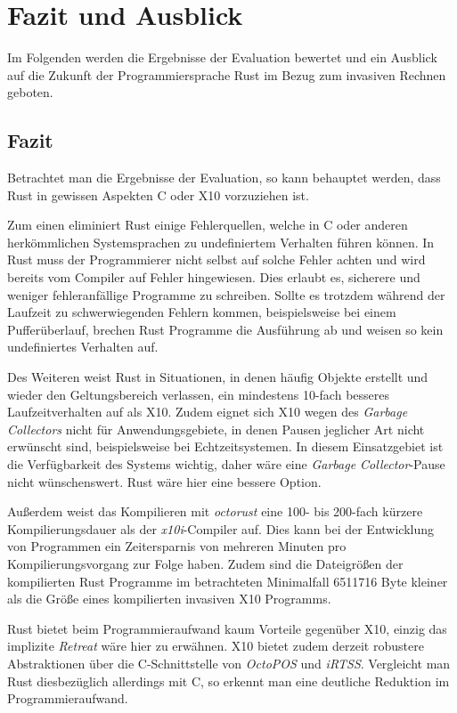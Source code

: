 \chapter{Fazit und Ausblick}\label{sec:conclusion}

Im Folgenden werden die Ergebnisse der Evaluation bewertet
und ein Ausblick auf die Zukunft der Programmiersprache Rust im Bezug zum invasiven Rechnen geboten.

\section{Fazit}

Betrachtet man die Ergebnisse der Evaluation, so kann behauptet werden,
dass Rust in gewissen Aspekten C oder X10 vorzuziehen ist.

Zum einen eliminiert Rust einige Fehlerquellen, welche in C oder anderen herkömmlichen
Systemsprachen zu undefiniertem Verhalten führen können.
In Rust muss der Programmierer nicht selbst auf solche Fehler achten und wird bereits vom Compiler auf Fehler
hingewiesen. Dies erlaubt es, sicherere und weniger fehleranfällige Programme zu schreiben.
Sollte es trotzdem während der Laufzeit zu schwerwiegenden Fehlern kommen, beispielsweise bei einem Pufferüberlauf,
brechen Rust Programme die Ausführung ab und weisen so kein undefiniertes Verhalten auf.

Des Weiteren weist Rust in Situationen, in denen häufig Objekte erstellt und wieder den Geltungsbereich verlassen,
ein mindestens 10-fach besseres Laufzeitverhalten auf als X10.
Zudem eignet sich X10 wegen des \textit{Garbage Collectors}
nicht für Anwendungsgebiete, in denen Pausen jeglicher Art nicht erwünscht sind,
beispielsweise bei Echtzeitsystemen.
In diesem Einsatzgebiet ist die Verfügbarkeit des Systems wichtig, daher wäre eine \textit{Garbage Collector}-Pause
nicht wünschenswert. Rust wäre hier eine bessere Option.

Außerdem weist das Kompilieren mit \textit{octorust} eine 100- bis 200-fach kürzere Kompilierungsdauer
als der \textit{x10i}-Compiler auf. Dies kann bei der Entwicklung von Programmen ein Zeitersparnis von
mehreren Minuten pro Kompilierungsvorgang zur Folge haben. 
Zudem sind die Dateigrößen der kompilierten Rust Programme im betrachteten Minimalfall 6511716 Byte kleiner
als die Größe eines kompilierten invasiven X10 Programms.

Rust bietet beim Programmieraufwand kaum Vorteile gegenüber X10, einzig das implizite \textit{Retreat} wäre hier zu 
erwähnen.
X10 bietet zudem derzeit robustere Abstraktionen über die C-Schnittstelle von \textit{OctoPOS} und
\textit{iRTSS}.
Vergleicht man Rust diesbezüglich allerdings mit C, so erkennt man eine deutliche Reduktion im Programmieraufwand.

